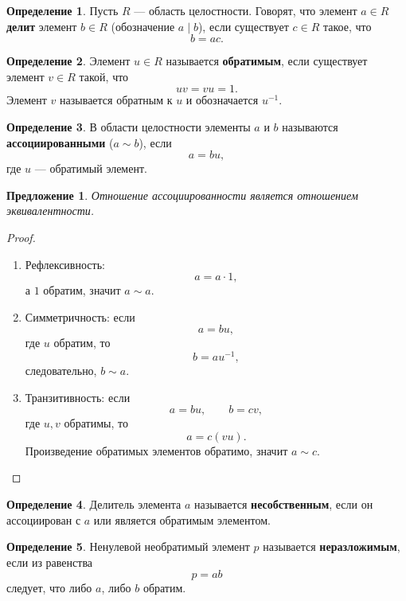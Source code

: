 \documentclass[12pt, a4paper]{article}
\newtheorem{proposition}{Предложение}
\theoremstyle{definition}
\newtheorem{definition}{Определение}
\theoremstyle{remark}
\begin{document}
\begin{definition}
	Пусть $R$ --- область целостности. Говорят, что элемент $a \in R$
	\textbf{делит} элемент $b \in R$ (обозначение $a \mid b$), если существует
	$c \in R$ такое, что
	\[
	b=ac.
	\]
\end{definition}

\begin{definition}
	Элемент $u \in R$ называется \textbf{обратимым}, если существует элемент
	$v \in R$ такой, что
	\[
	uv=vu=1.
	\]
	Элемент $v$ называется обратным к $u$ и обозначается $u^{-1}$.
\end{definition}

\begin{definition}
	В области целостности элементы $a$ и $b$ называются
	\textbf{ассоциированными} ($a \sim b$), если
	\[
	a=bu,
	\]
	где $u$ --- обратимый элемент.
\end{definition}

\begin{proposition}
	Отношение ассоциированности является отношением эквивалентности.
\end{proposition}

\begin{proof}
	\begin{enumerate}
		\item Рефлексивность:
		\[
		a=a\cdot 1,
		\]
		а $1$ обратим, значит $a \sim a$.
		
		\item Симметричность: если
		\[
		a=bu,
		\]
		где $u$ обратим, то
		\[
		b=au^{-1},
		\]
		следовательно, $b \sim a$.
		
		\item Транзитивность: если
		\[
		a=bu,\qquad b=cv,
		\]
		где $u,v$ обратимы, то
		\[
		a=c(vu).
		\]
		Произведение обратимых элементов обратимо, значит $a \sim c$.
	\end{enumerate}
\end{proof}

\begin{definition}
	Делитель элемента $a$ называется \textbf{несобственным}, если он
	ассоциирован с $a$ или является обратимым элементом.
\end{definition}

\begin{definition}
	Ненулевой необратимый элемент $p$ называется \textbf{неразложимым}, если
	из равенства
	\[
	p=ab
	\]
	следует, что либо $a$, либо $b$ обратим.
\end{definition}
\end{document}
